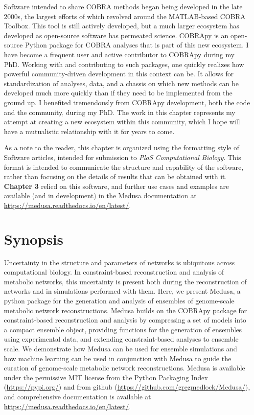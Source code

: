 \documentclass[11pt,twocolumn,notitlepage,openany,twoside]{book}
\begin{document}
\begin{refsection}
Software intended to share COBRA methods began being developed in the late 2000s, the largest efforts of which revolved around the MATLAB-based COBRA Toolbox. This tool is still actively developed, but a much larger ecosystem has developed as open-source software has permeated science. COBRApy is an open-source Python package for COBRA analyses that is part of this new ecosystem. I have become a frequent user and active contributor to COBRApy during my PhD. Working with and contributing to such packages, one quickly realizes how powerful community-driven development in this context can be. It allows for standardization of analyses, data, and a chassis on which new methods can be developed much more quickly than if they need to be implemented from the ground up. I benefited tremendously from COBRApy development, both the code and the community, during my PhD. The work in this chapter represents my attempt at creating a new ecosystem within this community, which I hope will have a mutualistic relationship with it for years to come.

As a note to the reader, this chapter is organized using the formatting style of Software articles, intended for submission to \textit{PloS Computational Biology}. This format is intended to communicate the structure and capability of the software, rather than focusing on the details of results that can be obtained with it. \textbf{Chapter 3} relied on this software, and further use cases and examples are available (and in development) in the Medusa documentation at \url{https://medusa.readthedocs.io/en/latest/}.

\section{Synopsis}

Uncertainty in the structure and parameters of networks is ubiquitous across computational biology. In constraint-based reconstruction and analysis of metabolic networks, this uncertainty is present both during the reconstruction of networks and in simulations performed with them. Here, we present Medusa, a python package for the generation and analysis of ensembles of genome-scale metabolic network reconstructions. Medusa builds on the COBRApy package for constraint-based reconstruction and analysis by compressing a set of models into a compact ensemble object, providing functions for the generation of ensembles using experimental data, and extending constraint-based analyses to ensemble scale. We demonstrate how Medusa can be used for ensemble simulations and how machine learning can be used in conjunction with Medusa to guide the curation of genome-scale metabolic network reconstructions. Medusa is available under the permissive MIT license from the Python Packaging Index (\url{https://pypi.org/}) and from github (\url{https://github.com/gregmedlock/Medusa/}), and comprehensive documentation is available at \url{https://medusa.readthedocs.io/en/latest/}.


\end{refsection}
\end{document}
